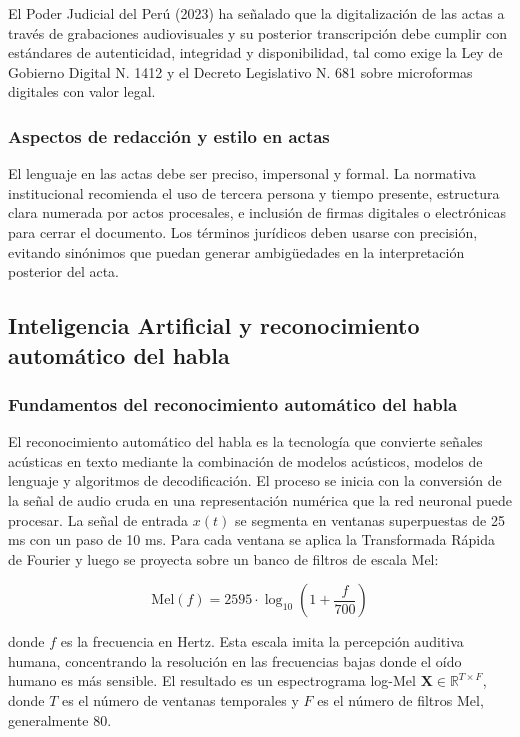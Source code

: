 \documentclass[12pt,a4paper,oneside]{article}
\begin{document}
El Poder Judicial del Per\'u (2023) ha se\~nalado que la digitalizaci\'on de las actas a trav\'es de grabaciones audiovisuales y su posterior transcripci\'on debe cumplir con est\'andares de autenticidad, integridad y disponibilidad, tal como exige la Ley de Gobierno Digital N.\textordmasculine{} 1412 y el Decreto Legislativo N.\textordmasculine{} 681 sobre microformas digitales con valor legal.

\subsubsection{Aspectos de redacci\'on y estilo en actas}

El lenguaje en las actas debe ser preciso, impersonal y formal. La normativa institucional recomienda el uso de tercera persona y tiempo presente, estructura clara numerada por actos procesales, e inclusi\'on de firmas digitales o electr\'onicas para cerrar el documento. Los t\'erminos jur\'idicos deben usarse con precisi\'on, evitando sin\'onimos que puedan generar ambig\"uedades en la interpretaci\'on posterior del acta.

\subsection{Inteligencia Artificial y reconocimiento autom\'atico del habla}

\subsubsection{Fundamentos del reconocimiento autom\'atico del habla}

El reconocimiento autom\'atico del habla es la tecnolog\'ia que convierte se\~nales ac\'usticas en texto mediante la combinaci\'on de modelos ac\'usticos, modelos de lenguaje y algoritmos de decodificaci\'on. El proceso se inicia con la conversi\'on de la se\~nal de audio cruda en una representaci\'on num\'erica que la red neuronal puede procesar. La se\~nal de entrada $x(t)$ se segmenta en ventanas superpuestas de 25 ms con un paso de 10 ms. Para cada ventana se aplica la Transformada R\'apida de Fourier y luego se proyecta sobre un banco de filtros de escala Mel:

\begin{equation}
\text{Mel}(f) = 2595 \cdot \log_{10}\!\left(1 + \frac{f}{700}\right)
\end{equation}

donde $f$ es la frecuencia en Hertz. Esta escala imita la percepci\'on auditiva humana, concentrando la resoluci\'on en las frecuencias bajas donde el o\'ido humano es m\'as sensible. El resultado es un espectrograma log-Mel $\mathbf{X} \in \mathbb{R}^{T \times F}$, donde $T$ es el n\'umero de ventanas temporales y $F$ es el n\'umero de filtros Mel, generalmente 80.
\end{document}
